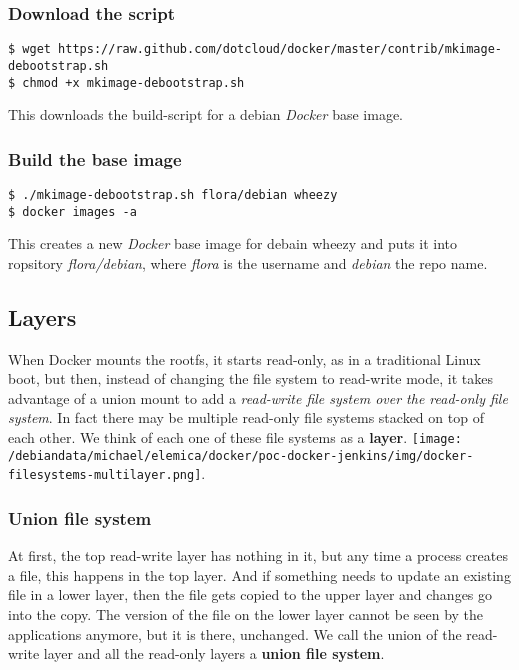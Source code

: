 \documentclass[11pt]{article}
\begin{document}
\subsubsection{Download the script}
\label{sec-2-4-1}


\begin{verbatim}
$ wget https://raw.github.com/dotcloud/docker/master/contrib/mkimage-debootstrap.sh
$ chmod +x mkimage-debootstrap.sh
\end{verbatim}
This downloads the build-script for a debian \emph{Docker} base image.
\subsubsection{Build the base image}
\label{sec-2-4-2}


\begin{verbatim}
$ ./mkimage-debootstrap.sh flora/debian wheezy 
$ docker images -a
\end{verbatim}
This creates a new \emph{Docker} base image for debain wheezy and puts it into ropsitory \emph{flora/debian}, where \emph{flora} is the username and \emph{debian} the repo name.
\subsection{Layers}
\label{sec-2-5}

   When Docker mounts the rootfs, it starts read-only, as in a traditional Linux boot, but then, instead of changing the file system to read-write mode, it takes advantage of a union mount to add a \emph{read-write file system over the read-only file system}. In fact there may be multiple read-only file systems stacked on top of each other. We think of each one of these file systems as a \textbf{layer}. \texttt{[image: /debiandata/michael/elemica/docker/poc-docker-jenkins/img/docker-filesystems-multilayer.png]}.
\subsubsection{Union file system}
\label{sec-2-5-1}

At first, the top read-write layer has nothing in it, but any time a process creates a file, this happens in the top layer. And if something needs to update an existing file in a lower layer, then the file gets copied to the upper layer and changes go into the copy. The version of the file on the lower layer cannot be seen by the applications anymore, but it is there, unchanged. We call the union of the read-write layer and all the read-only layers a \textbf{union file system}.
\end{document}
